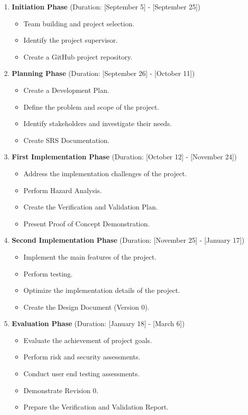 \documentclass{article}
\begin{document}
\begin{enumerate}
  \item \textbf{Initiation Phase} (Duration: [September 5] - [September 25])
  \begin{itemize}
    \item Team building and project selection.
    \item Identify the project supervisor.
    \item Create a GitHub project repository.
  \end{itemize}

  \item \textbf{Planning Phase} (Duration: [September 26] - [October 11])
  \begin{itemize}
    \item Create a Development Plan.
    \item Define the problem and scope of the project.
    \item Identify stakeholders and investigate their needs.
    \item Create SRS Documentation.
  \end{itemize}

  \item \textbf{First Implementation Phase} (Duration: [October 12] - [November 24])
  \begin{itemize}
    \item Address the implementation challenges of the project.
    \item Perform Hazard Analysis.
    \item Create the Verification and Validation Plan.
    \item Present Proof of Concept Demonstration.
  \end{itemize}
  
  \item \textbf{Second Implementation Phase} (Duration: [November 25] - [January 17])
  \begin{itemize}
    \item Implement the main features of the project.
    \item Perform testing.
    \item Optimize the implementation details of the project.
    \item Create the Design Document (Version 0).
  \end{itemize}

  \item \textbf{Evaluation Phase} (Duration: [January 18] - [March 6])
  \begin{itemize}
    \item Evaluate the achievement of project goals.
    \item Perform risk and security assessments.
    \item Conduct user end testing assessments.
    \item Demonstrate Revision 0.
    \item Prepare the Verification and Validation Report.
  \end{itemize}


\end{enumerate}
\end{document}
